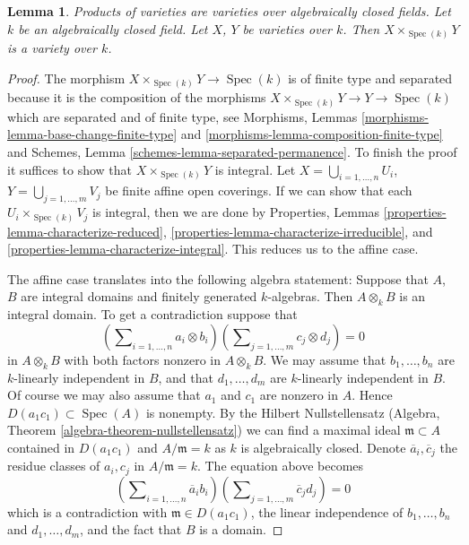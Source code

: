 \documentclass[10pt,a4paper]{amsart}
\theoremstyle{plain}
\newtheorem{lemma}[subsection]{Lemma}
\theoremstyle{definition}
\theoremstyle{remark}
\numberwithin{equation}{subsection}
\def\Spec{\mathop{\mathrm{Spec}}}
\newenvironment{slogan}{}{}
\begin{document}
\begin{lemma}
\label{lemma-product-varieties}
\begin{slogan}
Products of varieties are varieties over algebraically closed fields.
\end{slogan}
Let $k$ be an algebraically closed field.
Let $X$, $Y$ be varieties over $k$.
Then $X \times_{\Spec(k)} Y$ is a variety over $k$.
\end{lemma}

\begin{proof}
The morphism $X \times_{\Spec(k)} Y \to \Spec(k)$ is of
finite type and separated because it is the composition of the
morphisms $X \times_{\Spec(k)} Y \to Y \to \Spec(k)$
which are separated and of finite type, see
Morphisms, Lemmas \ref{morphisms-lemma-base-change-finite-type} and
\ref{morphisms-lemma-composition-finite-type}
and
Schemes, Lemma \ref{schemes-lemma-separated-permanence}.
To finish the proof it suffices to show that $X \times_{\Spec(k)} Y$
is integral.
Let $X = \bigcup_{i = 1, \ldots, n} U_i$,
$Y = \bigcup_{j = 1, \ldots, m} V_j$ be finite affine open coverings.
If we can show that each $U_i \times_{\Spec(k)} V_j$ is integral,
then we are done by
Properties, Lemmas \ref{properties-lemma-characterize-reduced},
\ref{properties-lemma-characterize-irreducible}, and
\ref{properties-lemma-characterize-integral}.
This reduces us to the affine case.

\medskip\noindent
The affine case translates into the following algebra statement: Suppose
that $A$, $B$ are integral domains and finitely generated $k$-algebras.
Then $A \otimes_k B$ is an integral domain. To get a contradiction suppose that
$$
(\sum\nolimits_{i = 1, \ldots, n} a_i \otimes b_i)
(\sum\nolimits_{j = 1, \ldots, m} c_j \otimes d_j) = 0
$$
in $A \otimes_k B$ with both factors nonzero in $A \otimes_k B$.
We may assume that $b_1, \ldots, b_n$ are $k$-linearly
independent in $B$, and that $d_1, \ldots, d_m$ are $k$-linearly independent
in $B$. Of course we may also assume that $a_1$ and $c_1$ are nonzero
in $A$. Hence $D(a_1c_1) \subset \Spec(A)$ is nonempty. By the
Hilbert Nullstellensatz
(Algebra, Theorem \ref{algebra-theorem-nullstellensatz})
we can find a maximal ideal $\mathfrak m \subset A$ contained in
$D(a_1c_1)$ and $A/\mathfrak m = k$ as $k$ is algebraically closed.
Denote $\overline{a}_i, \overline{c}_j$ the residue classes of
$a_i, c_j$ in $A/\mathfrak m = k$. The equation above becomes
$$
(\sum\nolimits_{i = 1, \ldots, n} \overline{a}_i b_i)
(\sum\nolimits_{j = 1, \ldots, m} \overline{c}_j d_j) = 0
$$
which is a contradiction with
$\mathfrak m \in D(a_1c_1)$, the linear independence of
$b_1, \ldots, b_n$ and $d_1, \ldots, d_m$, and the fact that $B$ is a domain.
\end{proof}
\end{document}
